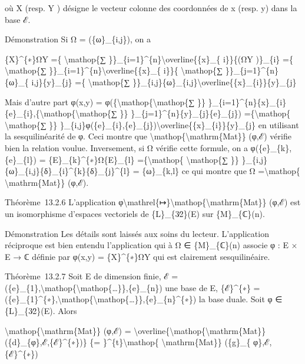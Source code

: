\documentclass[]{article}
\begin{document}
où X (resp. Y ) désigne le vecteur colonne des coordonnées de x (resp.
y) dans la base ℰ.

Démonstration Si Ω = (\{ω\}\_\{i,j\}), on a

\{X\}\^{}\{∗\}ΩY =\{ \textbackslash{}mathop\{∑
\}\}\_\{i=1\}\^{}\{n\}\textbackslash{}overline\{\{x\}\_\{ i\}\}\{(ΩY
)\}\_\{i\} =\{ \textbackslash{}mathop\{∑
\}\}\_\{i=1\}\^{}\{n\}\textbackslash{}overline\{\{x\}\_\{ i\}\}\{
\textbackslash{}mathop\{∑ \}\}\_\{j=1\}\^{}\{n\}\{ω\}\_\{
i,j\}\{y\}\_\{j\} =\{ \textbackslash{}mathop\{∑
\}\}\_\{i,j\}\{ω\}\_\{i,j\}\textbackslash{}overline\{\{x\}\_\{i\}\}\{y\}\_\{j\}

Mais d'autre part φ(x,y) =
φ(\{\textbackslash{}mathop\{\textbackslash{}mathop\{∑ \}\}
\}\_\{i=1\}\^{}\{n\}\{x\}\_\{i\}\{e\}\_\{i\},\{\textbackslash{}mathop\{\textbackslash{}mathop\{∑
\}\} \}\_\{j=1\}\^{}\{n\}\{y\}\_\{j\}\{e\}\_\{j\})
=\{\textbackslash{}mathop\{ \textbackslash{}mathop\{∑ \}\}
\}\_\{i,j\}φ(\{e\}\_\{i\},\{e\}\_\{j\})\textbackslash{}overline\{\{x\}\_\{i\}\}\{y\}\_\{j\}
en utilisant la sesquilinéarité de φ. Ceci montre que
\textbackslash{}mathop\{\textbackslash{}mathrm\{Mat\}\} (φ,ℰ) vérifie
bien la relation voulue. Inversement, si Ω vérifie cette formule, on a
φ(\{e\}\_\{k\},\{e\}\_\{l\}) = \{E\}\_\{k\}\^{}\{∗\}Ω\{E\}\_\{l\}
=\{\textbackslash{}mathop\{ \textbackslash{}mathop\{∑ \}\}
\}\_\{i,j\}\{ω\}\_\{i,j\}\{δ\}\_\{i\}\^{}\{k\}\{δ\}\_\{j\}\^{}\{l\} =
\{ω\}\_\{k,l\} ce qui montre que Ω =\textbackslash{}mathop\{
\textbackslash{}mathrm\{Mat\}\} (φ,ℰ).

Théorème~13.2.6 L'application
φ\textbackslash{}mathrel\{↦\}\textbackslash{}mathop\{\textbackslash{}mathrm\{Mat\}\}
(φ,ℰ) est un isomorphisme d'espaces vectoriels de \{L\}\_\{3∕2\}(E) sur
\{M\}\_\{ℂ\}(n).

Démonstration Les détails sont laissés aux soins du lecteur.
L'application réciproque est bien entendu l'application qui à Ω ∈
\{M\}\_\{ℂ\}(n) associe φ : E × E → ℂ définie par φ(x,y) =
\{X\}\^{}\{∗\}ΩY qui est clairement sesquilinéaire.

Théorème~13.2.7 Soit E de dimension finie, ℰ =
(\{e\}\_\{1\},\textbackslash{}mathop\{\textbackslash{}mathop\{\ldots{}\}\},\{e\}\_\{n\})
une base de E, \{ℰ\}\^{}\{∗\} =
(\{e\}\_\{1\}\^{}\{∗\},\textbackslash{}mathop\{\textbackslash{}mathop\{\ldots{}\}\},\{e\}\_\{n\}\^{}\{∗\})
la base duale. Soit φ ∈ \{L\}\_\{3∕2\}(E). Alors

\textbackslash{}mathop\{\textbackslash{}mathrm\{Mat\}\} (φ,ℰ) =
\textbackslash{}overline\{\textbackslash{}mathop\{\textbackslash{}mathrm\{Mat\}\}
(\{d\}\_\{φ\},ℰ,\{ℰ\}\^{}\{∗\})\} \{=
\}\^{}\{t\}\textbackslash{}mathop\{ \textbackslash{}mathrm\{Mat\}\}
(\{g\}\_\{ φ\},ℰ,\{ℰ\}\^{}\{∗\})
\end{document}
